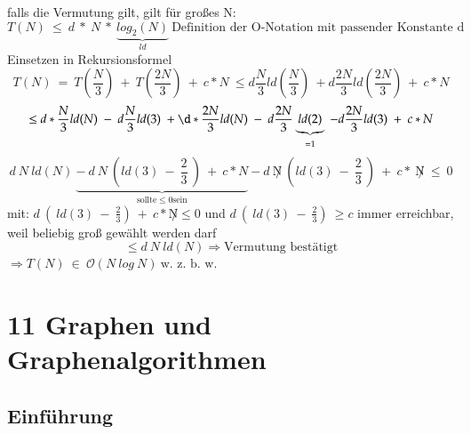 \documentclass[11pt, fleqn]{scrreprt}
\newcommand{\bigO}[0]{\mathcal{O}}
\begin{document}
\begin{itemize}
        falls die Vermutung gilt, gilt für großes N:
        \[ T(N)\ \leq\ d\ *\ N\ *\ \underbrace{log_2(N)}_{ld}\ \text{Definition der O-Notation mit passender Konstante d}\]
        Einsetzen in Rekursionsformel
        \[ T(N)\ =\ T\left(\frac{N}{3}\right)\ +\ T\left(\frac{2N}{3}\right)\ +\ c*N \ \leq d \frac{N}{3} ld\left(\frac{N}{3}\right)\ + d\frac{2N}{3} ld\left(\frac{2N}{3}\right)\ +\ c*N\]
        \[ \leq d*\frac{N}{3} ld(N)\ -\ d\frac{N}{3} ld(3)\ +\d*\frac{2N}{3} ld(N)\ -\ d\frac{2N}{3} \underbrace{ld(2)}_{=1}\ - d\frac{2N}{3} ld(3)\ +\ c*N \]
        \[ d\ N\ ld(N)\ \underbrace{-\ d\ N\ \left(ld(3)\ -\ \frac{2}{3}\ \right)\ +\ c*N}_{\text{sollte} \leq 0\text{sein}} - d\ \not N\  \left(ld(3)\ - \ \frac{2}{3}\ \right)\ +\ c*\ \not N\ \leq\ 0\]
        mit:
        \hspace*{1cm} $d\ \left(\ ld(3)\ -\ \frac{2}{3}\right)\ +\ c* \not N \leq 0$ und $d\ \left(\ ld(3)\ -\ \frac{2}{3}\right)\ \geq c$ immer erreichbar, weil beliebig groß gewählt werden darf
        \[ \leq d\ N\ ld(N) \Rightarrow \text{Vermutung bestätigt}\]
        $\Rightarrow T(N)\ \in\ \bigO{}(N\ log\ N)\  \text{w. z. b. w.}$
    \end{itemize}


\chapter*{11 Graphen und Graphenalgorithmen}
\section*{Einführung}
\end{document}
